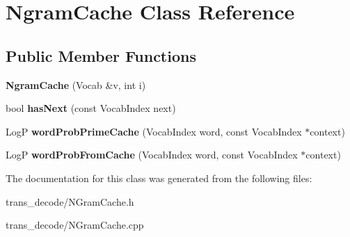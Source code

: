 \hypertarget{class_ngram_cache}{
\section{NgramCache Class Reference}
\label{class_ngram_cache}
}
\subsection*{Public Member Functions}
\begin{DoxyCompactItemize}
\item 
\hypertarget{class_ngram_cache_a1d8b66016081c1e0d15b2199e48c4df9}{
{\bfseries NgramCache} (Vocab \&v, int i)}
\label{class_ngram_cache_a1d8b66016081c1e0d15b2199e48c4df9}

\item 
\hypertarget{class_ngram_cache_aaf831fb4e48aa1a8f8d46287adb7c419}{
bool {\bfseries hasNext} (const VocabIndex next)}
\label{class_ngram_cache_aaf831fb4e48aa1a8f8d46287adb7c419}

\item 
\hypertarget{class_ngram_cache_a3444ab6a1b5a140edb089efb51b071c1}{
LogP {\bfseries wordProbPrimeCache} (VocabIndex word, const VocabIndex $\ast$context)}
\label{class_ngram_cache_a3444ab6a1b5a140edb089efb51b071c1}

\item 
\hypertarget{class_ngram_cache_a7806b0a2832644fcde66aa928a58caa9}{
LogP {\bfseries wordProbFromCache} (VocabIndex word, const VocabIndex $\ast$context)}
\label{class_ngram_cache_a7806b0a2832644fcde66aa928a58caa9}

\end{DoxyCompactItemize}


The documentation for this class was generated from the following files:\begin{DoxyCompactItemize}
\item 
trans\_\-decode/NGramCache.h\item 
trans\_\-decode/NGramCache.cpp\end{DoxyCompactItemize}
